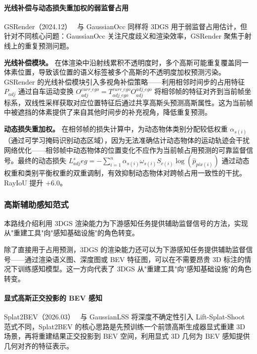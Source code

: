 \paragraph{光线补偿与动态损失重加权的弱监督占用}

GSRender（2024.12）~\cite{2412_14579} 与 GaussianOcc 同样将 3DGS 用于弱监督占用估计，但针对不同核心问题：GaussianOcc 关注尺度歧义和渲染效率，GSRender 聚焦于射线上的重复预测问题。

\textbf{光线补偿模块。} 在体渲染中沿射线累积不透明度时，多个高斯可能重复覆盖同一体素位置，导致该位置的语义标签被多个高斯的不透明度加权预测污染。GSRender 的光线补偿模块引入多视角补偿策略——利用相邻时间步的占用特征 $P_{adj}$ 通过自车运动变换 $O_{adj}^{curr\_ego} = T_{adj\_ego}^{curr\_ego} O_{adj}^{adj\_ego}$ 将相邻帧的特征对齐到当前帧坐标系，双线性采样获取对应位置特征后通过共享高斯头预测高斯属性。这为当前帧中被遮挡的体素提供了来自其他时间步的补充视角，降低重复预测。

\textbf{动态损失重加权。} 在相邻帧的损失计算中，为动态物体类别分配较低权重 $\alpha_{s(i)}$（通过可学习掩码识别动态区域），因为无法准确估计动态物体的运动轨迹会干扰网络优化——相邻帧中动态物体的位置变化不应作为当前帧占用预测的可靠监督信号。最终的动态损失 $L_{adj}^seg = -\sum_{i=1}^n \alpha_{s(i)} \omega_{s(i)} S_{c(i)} \log(\hat{p}_{pix(i)})$ 通过动态权重和类别平衡权重的双重调制，有效抑制动态物体对跨帧占用一致性的干扰。RayIoU 提升 +6.0。

\subsubsection{高斯辅助感知范式}

本路线介绍利用 3DGS 渲染能力为下游感知任务提供辅助监督信号的方法，实现从"重建工具"向"感知基础设施"的角色转变。

除了直接用于占用预测，3DGS 的渲染能力还可以为下游感知任务提供辅助监督信号——通过渲染语义图、深度图或 BEV 特征图，可以在不需要昂贵 3D 标注的情况下训练感知模型。这一方向代表了 3DGS 从"重建工具"向"感知基础设施"的角色转变。

\paragraph{显式高斯正交投影的 BEV 感知}

Splat2BEV（2026.03）~\cite{2603_19193} 与 GaussianLSS 将深度不确定性引入 Lift-Splat-Shoot 范式不同，Splat2BEV 的核心思路是先预训练一个前馈高斯生成器显式重建 3D 场景，再将重建结果正交投影到 BEV 空间，利用显式 3D 几何为 BEV 感知提供几何对齐的特征表示。


